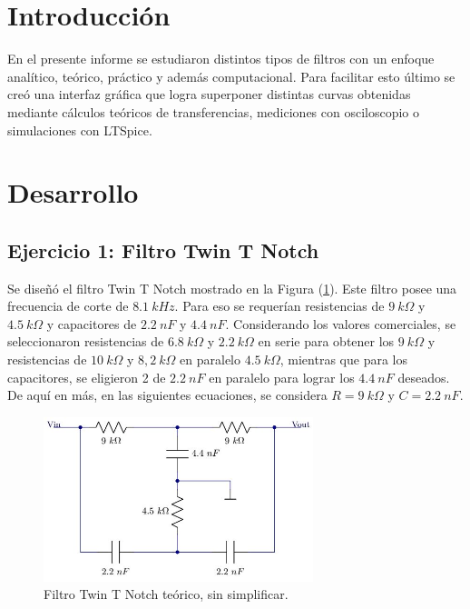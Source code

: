 \documentclass[a4paper]{article}
\begin{document}




\section{Introducción}

En el presente informe se estudiaron distintos tipos de filtros con un enfoque analítico, teórico, práctico y además computacional. Para facilitar esto último se creó una interfaz gráfica que logra superponer distintas curvas obtenidas mediante cálculos teóricos de transferencias, mediciones con osciloscopio o simulaciones con LTSpice.

\section{Desarrollo}

\subsection{Ejercicio 1: Filtro Twin T Notch}

Se diseñó el filtro Twin T Notch mostrado en la Figura (\ref{fig:filtroinicial}). Este filtro posee una frecuencia de corte de $ 8.1 \ kHz $. Para eso se requerían resistencias de $ 9 \ k\Omega $ y $ 4.5 \ k\Omega $ y capacitores de $ 2.2 \ nF $ y $ 4.4 \ nF $. Considerando los valores comerciales, se seleccionaron resistencias de $ 6.8 \ k\Omega $ y $ 2.2 \ k\Omega $ en serie para obtener los $ 9 \ k\Omega $ y  resistencias de $ 10 \ k\Omega $ y $ 8,2 \ k\Omega $ en paralelo $ 4.5 \ k\Omega $, mientras que para los capacitores, se eligieron 2 de $ 2.2 \ nF $ en paralelo para lograr los $ 4.4 \ nF $ deseados.
De aquí en más, en las siguientes ecuaciones, se considera $ R = 9 \ k\Omega $ y $ C = 2.2 \ nF $.

\begin{figure}[H]
	\centering
	\includegraphics[width=0.7\textwidth ,trim={0 0.1cm  0.5cm 0},clip]{ej1inicial.jpg}
\caption{Filtro Twin T Notch teórico, sin simplificar.}
	\label{fig:filtroinicial}
\end{figure}
\end{document}
